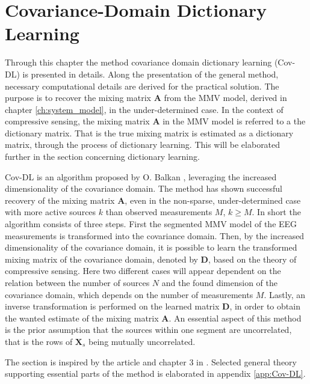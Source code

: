 \chapter{Covariance-Domain Dictionary Learning}\label{ch:Cov-DL}
Through this chapter the method covariance domain dictionary learning (Cov-DL) is presented in details. 
Along the presentation of the general method, necessary computational details are derived for the practical solution.
The purpose is to recover the mixing matrix $\mathbf{A}$ from the MMV model, derived in chapter \ref{ch:system_model}, in the under-determined case. 
In the context of compressive sensing, the mixing matrix $\mathbf{A}$ in the MMV model is referred to a the dictionary matrix. 
That is the true mixing matrix is estimated as a dictionary matrix, through the process of dictionary learning. 
This will be elaborated further in the section concerning dictionary learning.

Cov-DL is an algorithm proposed by O. Balkan \cite{Balkan2015}, leveraging the increased dimensionality of the covariance domain. 
The method has shown successful recovery of the mixing matrix $\mathbf{A}$, even in the non-sparse, under-determined case with more active sources $k$ than observed measurements $M$, $k \geq M$. 
In short the algorithm consists of three steps. 
First the segmented MMV model of the EEG measurements is transformed into the covariance domain. 
Then, by the increased dimensionality of the covariance domain, it is possible to learn the transformed mixing matrix of the covariance domain, denoted by $\mathbf{D}$, based on the theory of compressive sensing. 
Here two different cases will appear dependent on the relation between the number of sources $N$ and the found dimension of the covariance domain, which depends on the number of measurements $M$. 
Lastly, an inverse transformation is performed on the learned matrix $\textbf{D}$, in order to obtain the wanted estimate of the mixing matrix $\mathbf{A}$. 
An essential aspect of this method is the prior assumption that the sources within one segment are uncorrelated, that is the rows of $\mathbf{X}_s$ being mutually uncorrelated. 

The section is inspired by the article \cite{Balkan2015} and chapter 3 in \cite{phd2015}. 
Selected general theory supporting essential parts of the method is elaborated in appendix \ref{app:Cov-DL}.


%